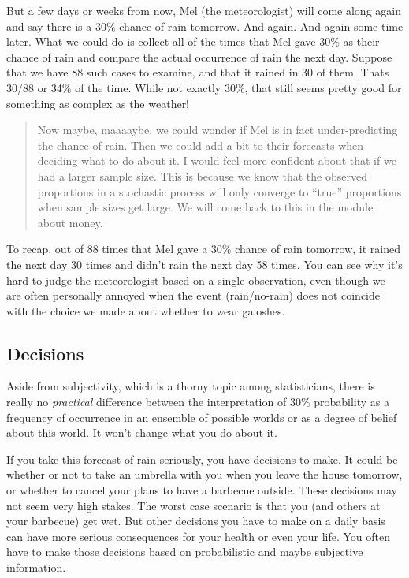 \documentclass[
  openany]{book}
\begin{document}
But a few days or weeks from now, Mel (the meteorologist) will come along again and say there is a 30\% chance of rain tomorrow. And again. And again some time later. What we could do is collect all of the times that Mel gave 30\% as their chance of rain and compare the actual occurrence of rain the next day. Suppose that we have 88 such cases to examine, and that it rained in 30 of them. Thats 30/88 or 34\% of the time. While not exactly 30\%, that still seems pretty good for something as complex as the weather!

\begin{quote}
Now maybe, maaaaybe, we could wonder if Mel is in fact under-predicting the chance of rain. Then we could add a bit to their forecasts when deciding what to do about it. I would feel more confident about that if we had a larger sample size. This is because we know that the observed proportions in a stochastic process will only converge to ``true'' proportions when sample sizes get large. We will come back to this in the module about money.
\end{quote}

To recap, out of 88 times that Mel gave a 30\% chance of rain tomorrow, it rained the next day 30 times and didn't rain the next day 58 times. You can see why it's hard to judge the meteorologist based on a single observation, even though we are often personally annoyed when the event (rain/no-rain) does not coincide with the choice we made about whether to wear galoshes.

\hypertarget{decisions}{%
\subsection*{Decisions}\label{decisions}}

Aside from subjectivity, which is a thorny topic among statisticians, there is really no \emph{practical} difference between the interpretation of 30\% probability as a frequency of occurrence in an ensemble of possible worlds or as a degree of belief about this world. It won't change what you do about it.

If you take this forecast of rain seriously, you have decisions to make. It could be whether or not to take an umbrella with you when you leave the house tomorrow, or whether to cancel your plans to have a barbecue outside. These decisions may not seem very high stakes. The worst case scenario is that you (and others at your barbecue) get wet. But other decisions you have to make on a daily basis can have more serious consequences for your health or even your life. You often have to make those decisions based on probabilistic and maybe subjective information.
\end{document}
